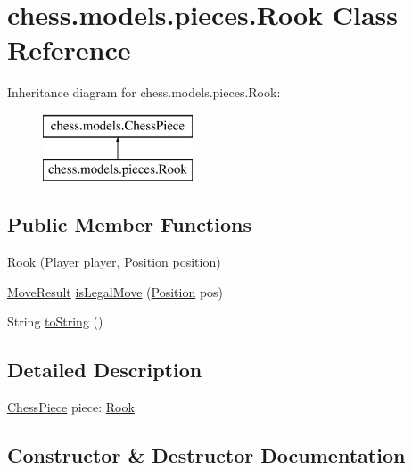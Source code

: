 \hypertarget{classchess_1_1models_1_1pieces_1_1_rook}{}\section{chess.\+models.\+pieces.\+Rook Class Reference}
\label{classchess_1_1models_1_1pieces_1_1_rook}
Inheritance diagram for chess.\+models.\+pieces.\+Rook\+:\begin{figure}[H]
\begin{center}
\leavevmode
\includegraphics[height=2.000000cm]{classchess_1_1models_1_1pieces_1_1_rook}
\end{center}
\end{figure}
\subsection*{Public Member Functions}
\begin{DoxyCompactItemize}
\item 
\mbox{\hyperlink{classchess_1_1models_1_1pieces_1_1_rook_a6a09ddec79bb71f7b497e0faf8b02152}{Rook}} (\mbox{\hyperlink{enumchess_1_1models_1_1enums_1_1_player}{Player}} player, \mbox{\hyperlink{classchess_1_1models_1_1_position}{Position}} position)
\item 
\mbox{\hyperlink{enumchess_1_1models_1_1enums_1_1_move_result}{Move\+Result}} \mbox{\hyperlink{classchess_1_1models_1_1pieces_1_1_rook_adf20fa1c361d9122cae9fd20f543f8e4}{is\+Legal\+Move}} (\mbox{\hyperlink{classchess_1_1models_1_1_position}{Position}} pos)
\item 
String \mbox{\hyperlink{classchess_1_1models_1_1pieces_1_1_rook_a73f28ce35486a866fabe250ad4490993}{to\+String}} ()
\end{DoxyCompactItemize}


\subsection{Detailed Description}
\mbox{\hyperlink{classchess_1_1models_1_1_chess_piece}{Chess\+Piece}} piece\+: \mbox{\hyperlink{classchess_1_1models_1_1pieces_1_1_rook}{Rook}} 

\subsection{Constructor \& Destructor Documentation}
\mbox{\label{classchess_1_1models_1_1pieces_1_1_rook_a6a09ddec79bb71f7b497e0faf8b02152}} 

